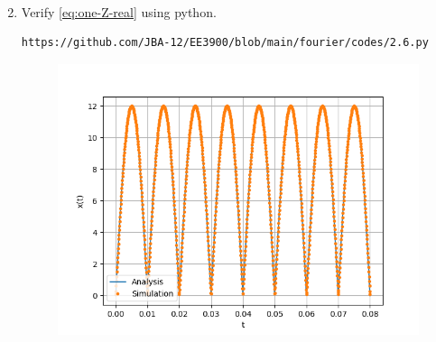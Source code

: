 \documentclass[journal,12pt,twocolumn]{IEEEtran}
\renewcommand\thesection{\arabic{section}}
\begin{document}
\begin{enumerate}[label=\thesection.\arabic*,ref=\thesection.\theenumi]
\begin{align}
    \end{align}
    \item Verify 
    \eqref{eq:one-Z-real}
    using python.\\
     \solution 
        \begin{lstlisting}
https://github.com/JBA-12/EE3900/blob/main/fourier/codes/2.6.py
        \end{lstlisting}
          \begin{figure}[!ht]
			\centering
			\includegraphics[width=\columnwidth]{figs/2.6.png}
			\caption{}
\end{figure}
    \end{enumerate}
\end{document}
